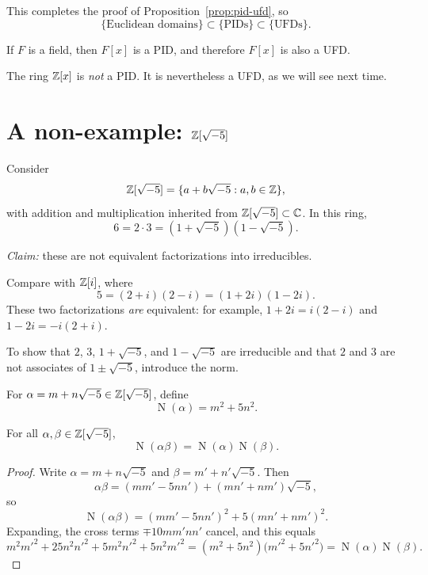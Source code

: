 \documentclass[reqno,11pt]{amsart}
\newcommand{\C}{\mathbb{C}}
\newcommand{\Nm}{\operatorname{N}}
\begin{document}
This completes the proof of Proposition~\ref{prop:pid-ufd}, so
\[
  \{\text{Euclidean domains}\}\subset\{\text{PIDs}\}\subset\{\text{UFDs}\}.
\]

\begin{example}
If $F$ is a field, then $F[x]$ is a PID, and therefore $F[x]$ is
also a UFD.
\end{example}

\begin{warningbox}
The ring $\mathbb{Z}[x]$ is \emph{not} a PID. It is nevertheless a UFD, as
we will see next time.
\end{warningbox}

\section{A non-example: \texorpdfstring{$\mathbb{Z}[\sqrt{-5}]$}{Z[sqrt(-5)]}}

Consider
\[
  \mathbb{Z}[\sqrt{-5}]=\{a+b\sqrt{-5}:a,b\in\mathbb{Z}\},
\]
with addition and multiplication inherited from
$\Z[\sqrt{-5}]\subset\C$. In this ring,
\[
  6=2\cdot3=(1+\sqrt{-5})(1-\sqrt{-5}).
\]

\emph{Claim:} these are not equivalent factorizations into
irreducibles.

\begin{remark}
Compare with $\mathbb{Z}[i]$, where
\[
  5=(2+i)(2-i)=(1+2i)(1-2i).
\]
These two factorizations \emph{are} equivalent: for example,
$1+2i=i(2-i)$ and $1-2i=-i(2+i)$.
\end{remark}

To show that $2$, $3$, $1+\sqrt{-5}$, and $1-\sqrt{-5}$ are
irreducible and that $2$ and $3$ are not associates of
$1\pm\sqrt{-5}$, introduce the norm.

\begin{definition}[Norm]
For $\alpha=m+n\sqrt{-5}\in\mathbb{Z}[\sqrt{-5}]$, define
\[
  \Nm(\alpha)=m^2+5n^2.
\]
\end{definition}

\begin{lemma}\label{lem:norm-mult}
For all $\alpha,\beta\in\mathbb{Z}[\sqrt{-5}]$,
\[
  \boxed{\Nm(\alpha\beta)=\Nm(\alpha)\Nm(\beta).}
\]
\end{lemma}
\begin{proof}
Write $\alpha=m+n\sqrt{-5}$ and $\beta=m'+n'\sqrt{-5}$. Then
\[
  \alpha\beta=(mm'-5nn')+(mn'+nm')\sqrt{-5},
\]
so
\[
  \Nm(\alpha\beta)=(mm'-5nn')^2+5(mn'+nm')^2.
\]
Expanding, the cross terms $\mp10mm'nn'$ cancel, and this equals
\[
  m^2m'^2+25n^2n'^2+5m^2n'^2+5n^2m'^2
  =(m^2+5n^2)\bigl(m'^2+5n'^2\bigr)=\Nm(\alpha)\Nm(\beta).
\]
\end{proof}
\end{document}
